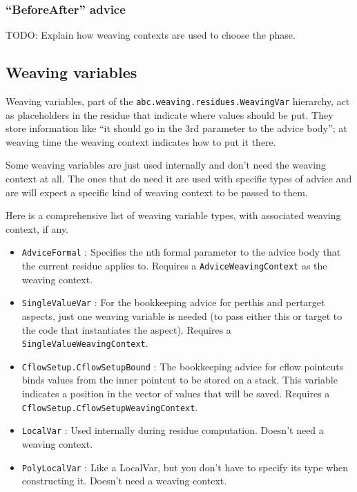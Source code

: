 \documentclass{article}
\begin{document}
\subsubsection{``BeforeAfter'' advice}

TODO: Explain how weaving contexts are used to choose the phase.

\subsection{Weaving variables}

Weaving variables, part of the \verb|abc.weaving.residues.WeavingVar|
hierarchy, act as placeholders in the residue that indicate where values
should be put. They store information like ``it should go in the 3rd parameter
to the advice body''; at weaving time the weaving context indicates how to
put it there. 

Some weaving variables are just used internally and don't
need the weaving context at all.
The ones that do need it are used with specific types of advice
and are will expect a specific kind of weaving context to be passed to them.

Here is a comprehensive list of weaving variable types, with associated
weaving context, if any.
\begin{itemize}
\item \verb|AdviceFormal| : Specifies the nth formal parameter
to the advice body that the current residue applies to. Requires
a \verb|AdviceWeavingContext| as the weaving context.
\item \verb|SingleValueVar| : For the bookkeeping advice for
perthis and pertarget aspects,
just one weaving variable is needed (to pass either this or target to
the code that instantiates the aspect). Requires a 
\verb|SingleValueWeavingContext|.
\item \verb|CflowSetup.CflowSetupBound| : The bookkeeping advice for
cflow pointcuts binds values from the inner pointcut to be stored on a stack.
This variable indicates a position in the vector of values that will be saved.
Requires a \verb|CflowSetup.CflowSetupWeavingContext|.
\item \verb|LocalVar| : Used internally during residue computation. Doesn't
need a weaving context.
\item \verb|PolyLocalVar| : Like a LocalVar, but you don't have to specify
its type when constructing it. Doesn't need a weaving context.
\end{itemize}
\end{document}
